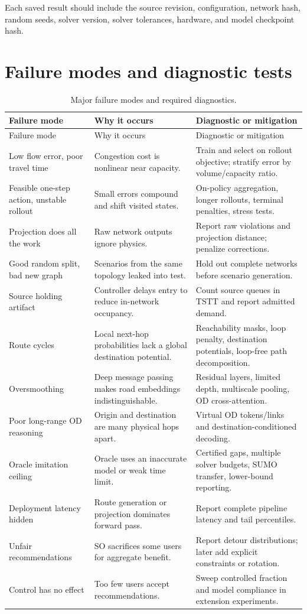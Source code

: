 \documentclass[11pt]{article}
\begin{document}
Each saved result should include the source revision, configuration, network hash,
random seeds, solver version, solver tolerances, hardware, and model checkpoint hash.

\section{Failure modes and diagnostic tests}

\begin{longtable}{@{}p{}p{}p{}@{}}
\caption{Major failure modes and required diagnostics.}\label{tab:failures}\\
\toprule
Failure mode & Why it occurs & Diagnostic or mitigation \\
\midrule
\endfirsthead
\toprule
Failure mode & Why it occurs & Diagnostic or mitigation \\
\midrule
\endhead
Low flow error, poor travel time & Congestion cost is nonlinear near capacity. & Train and select on rollout objective; stratify error by volume/capacity ratio. \\
Feasible one-step action, unstable rollout & Small errors compound and shift visited states. & On-policy aggregation, longer rollouts, terminal penalties, stress tests. \\
Projection does all the work & Raw network outputs ignore physics. & Report raw violations and projection distance; penalize corrections. \\
Good random split, bad new graph & Scenarios from the same topology leaked into test. & Hold out complete networks before scenario generation. \\
Source holding artifact & Controller delays entry to reduce in-network occupancy. & Count source queues in TSTT and report admitted demand. \\
Route cycles & Local next-hop probabilities lack a global destination potential. & Reachability masks, loop penalty, destination potentials, loop-free path decomposition. \\
Oversmoothing & Deep message passing makes road embeddings indistinguishable. & Residual layers, limited depth, multiscale pooling, OD cross-attention. \\
Poor long-range OD reasoning & Origin and destination are many physical hops apart. & Virtual OD tokens/links and destination-conditioned decoding. \\
Oracle imitation ceiling & Oracle uses an inaccurate model or weak time limit. & Certified gaps, multiple solver budgets, SUMO transfer, lower-bound reporting. \\
Deployment latency hidden & Route generation or projection dominates forward pass. & Report complete pipeline latency and tail percentiles. \\
Unfair recommendations & SO sacrifices some users for aggregate benefit. & Report detour distributions; later add explicit constraints or rotation. \\
Control has no effect & Too few users accept recommendations. & Sweep controlled fraction and model compliance in extension experiments. \\
\bottomrule
\end{longtable}
\end{document}
